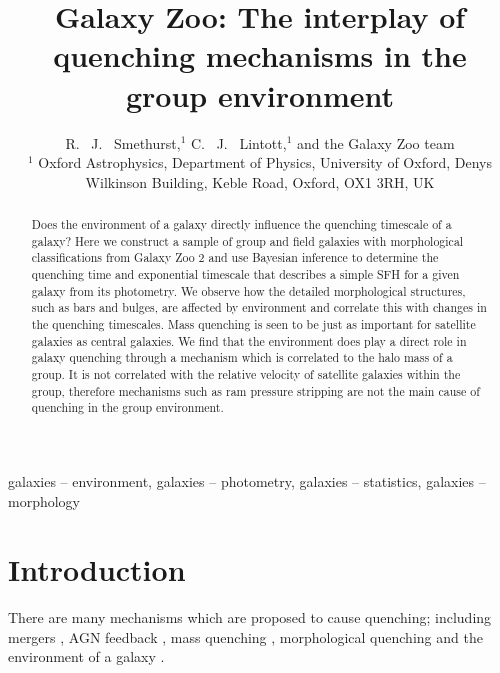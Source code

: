 \documentclass[useAMS,usenatbib]{mn2e}
\begin{document}
\title[Group environment quenching mechanisms]{Galaxy Zoo: The interplay of quenching mechanisms in the group environment}
\author[Smethurst et al. 2015]{R. ~J. ~Smethurst,$^{1}$ C. ~J. ~Lintott,$^{1}$ and the Galaxy Zoo team \footnotemark[1]
\\ $^1$ Oxford Astrophysics, Department of Physics, University of Oxford, Denys Wilkinson Building, Keble Road, Oxford, OX1 3RH, UK 
}

\maketitle

\begin{abstract}
Does the environment of a galaxy directly influence the quenching timescale of a galaxy? Here we construct a sample of group and field galaxies with morphological classifications from Galaxy Zoo 2 and use Bayesian inference to determine the quenching time and exponential timescale that describes a simple SFH for a given galaxy from its photometry. We observe how the detailed morphological structures, such as bars and bulges, are affected by environment and correlate this with changes in the quenching timescales. Mass quenching is seen to be just as important for satellite galaxies as central galaxies.  We find that the environment does play a direct role in galaxy quenching through a mechanism which is correlated to the halo mass of a group. It is not correlated with the relative velocity of satellite galaxies within the group, therefore mechanisms such as ram pressure stripping are not the main cause of quenching in the group environment. 

\end{abstract}

\begin{keywords}
galaxies -- environment, galaxies -- photometry, galaxies -- statistics, galaxies -- morphology
\end{keywords}


\section{Introduction}\label{sec:intro}
 
 There are many mechanisms which are proposed to cause quenching; including mergers \citep{daddi10, darg10b, cheung12, barro13, pontzen16}, AGN feedback \citep{dimatteo05, nandra07}, mass quenching \citep{peng12}, morphological quenching \citep{fang13} and the environment of a galaxy \citep[see review of mechanisms in][and references therein]{boselli06}.
 
\end{document}
